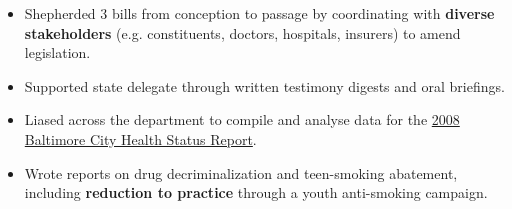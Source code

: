 \documentclass[margin]{res}
\begin{document}
\begin{sloppypar}
\begin{resume}
\begin{itemize}
    \item Shepherded 3 bills from conception to passage by coordinating with \textbf{diverse stakeholders} (e.g. constituents, doctors, hospitals, insurers) to amend legislation.
    \item Supported state delegate through written testimony digests and oral briefings.
\end{itemize}

\begin{itemize}
    \item Liased across the department to compile and analyse data for the \href{http://wwww.baltimorehealth.org/info/HSR/2008_BaltCityHSR_final.pdf}{2008 Baltimore City Health Status Report}. 
    \item Wrote reports on drug decriminalization and teen-smoking abatement, including \textbf{reduction to practice} through a youth anti-smoking campaign.
\end{itemize}






%
%
%


\end{resume}
\end{sloppypar}
\end{document}
